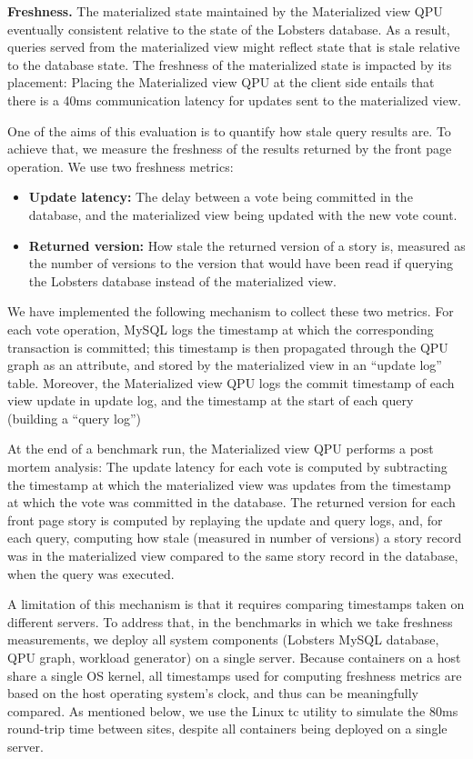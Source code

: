 \bigskip
\noindent
\textbf{Freshness.} The materialized state maintained by the Materialized view QPU eventually consistent
relative to the state of the Lobsters database.
As a result, queries served from the materialized view might reflect state that is stale relative to the database state.
The freshness of the materialized state is impacted by its placement:
Placing the Materialized view QPU at the client side entails that there is a 40ms communication latency for updates
sent to the materialized view.

One of the aims of this evaluation is to quantify how stale query results are.
To achieve that, we measure the freshness of the results returned by the front page operation.
We use two freshness metrics:
\begin{itemize}
  \item \textbf{Update latency:} The delay between a vote being committed in the database, and the materialized view being
  updated with the new vote count.
  \item \textbf{Returned version:} How stale the returned version of a story is, measured as the number of versions
  to the version that would have been read if querying the Lobsters database instead of the materialized view.
\end{itemize}

We have implemented the following mechanism to collect these two metrics.
For each vote operation, MySQL logs the timestamp at which the corresponding transaction is committed;
this timestamp is then propagated through the QPU graph as an attribute, and stored by the materialized view in an
``update log'' table.
Moreover, the Materialized view QPU logs the commit timestamp of each view update in update log,
and the timestamp at the start of each query (building a ``query log'')

At the end of a benchmark run, the Materialized view QPU performs a post mortem analysis:
The update latency for each vote is computed by subtracting the timestamp at which the materialized view was updates from
the timestamp at which the vote was committed in the database.
The returned version for each front page story is computed by replaying the update and query logs,
and, for each query, computing how stale (measured in number of versions) a story record was in the materialized view
compared to the same story record in the database, when the query was executed.

A limitation of this mechanism is that it requires comparing timestamps taken on different servers.
To address that, in the benchmarks in which we take freshness measurements,
we deploy all system components (Lobsters MySQL database, QPU graph, workload generator) on a single server.
Because containers on a host share a single OS kernel, all timestamps used for computing freshness metrics are based
on the host operating system's clock, and thus can be meaningfully compared.
As mentioned below, we use the Linux tc utility \cite{tc} to simulate the 80ms round-trip time between sites,
despite all containers being deployed on a single server.

